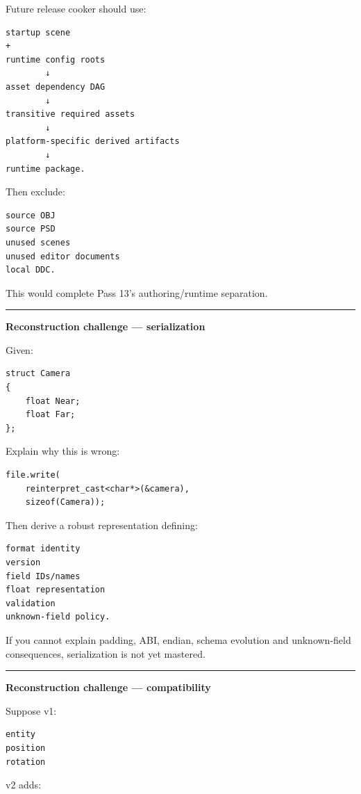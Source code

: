 Future release cooker should use:

\begin{verbatim}
startup scene
+
runtime config roots
        ↓
asset dependency DAG
        ↓
transitive required assets
        ↓
platform-specific derived artifacts
        ↓
runtime package.
\end{verbatim}

Then exclude:

\begin{verbatim}
source OBJ
source PSD
unused scenes
unused editor documents
local DDC.
\end{verbatim}

This would complete Pass 13's authoring/runtime separation.

\begin{center}\rule{0.5\linewidth}{0.5pt}\end{center}

\textbf{Reconstruction challenge --- serialization}

Given:

\begin{verbatim}
struct Camera
{
    float Near;
    float Far;
};
\end{verbatim}

Explain why this is wrong:

\begin{verbatim}
file.write(
    reinterpret_cast<char*>(&camera),
    sizeof(Camera));
\end{verbatim}

Then derive a robust representation defining:

\begin{verbatim}
format identity
version
field IDs/names
float representation
validation
unknown-field policy.
\end{verbatim}

If you cannot explain padding, ABI, endian, schema evolution and unknown-field consequences, serialization is not yet mastered.

\begin{center}\rule{0.5\linewidth}{0.5pt}\end{center}

\textbf{Reconstruction challenge --- compatibility}

Suppose v1:

\begin{verbatim}
entity
position
rotation
\end{verbatim}

v2 adds:

